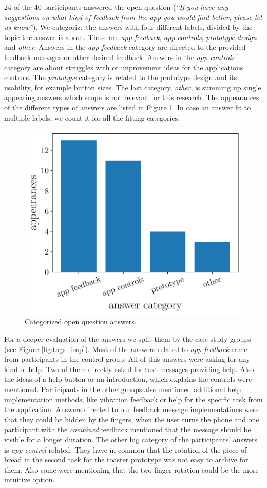 \documentclass[11pt, a4paper]{article}
\begin{document}
			24 of the 40 participants answered the open question (\emph{``If you have any suggestions on what kind of feedback from the app you would find better, please let us know''}). We categorize the answers with four different labels, divided by the topic the answer is about. These are \emph{app feedback}, \emph{app controls}, \emph{prototype design} and \emph{other}. Answers in the \emph{app feedback} category are directed to the provided feedback messages or other desired feedback. Answers in the \emph{app controls} category are about struggles with or improvement ideas for the applications controls. The \emph{prototype} category is related to the prototype design and its usability, for example button sizes. The last category, \emph{other}, is summing up single appearing answers which scope is not relevant for this research. The appearances of the different types of answers are listed in Figure \ref{fig:tags}. In case an answer fit to multiple labels, we count it for all the fitting categories.

			\begin{figure}[H]
				\centering
				\includegraphics[width=.49\textwidth]{img/plot/plot_tags.pdf}
				\caption{Categorized open question answers.}
				\label{fig:tags}
			\end{figure}
			
			For a deeper evaluation of the answers we split them by the case study groups (see Figure \ref{fig:tags_imp}). 
			Most of the answers related to \emph{app feedback} came from participants in the control group. All of this answers were asking for any kind of help. Two of them directly asked for text messages providing help. Also the ideas of a help button or an introduction, which explains the controls were mentioned. Participants in the other groups also mentioned additional help implementation methods, like vibration feedback or help for the specific task from the application. Answers directed to our feedback message implementations were that they could be hidden by the fingers, when the user turns the phone and one participant with the \emph{combined} feedback mentioned that the message should be visible for a longer duration. The other big category of the participants' answers is \emph{app control} related. They have in common that the rotation of the piece of bread in the second task for the toaster prototype was not easy to archive for them. Also some were mentioning that the two-finger rotation could be the more intuitive option.
\end{document}
